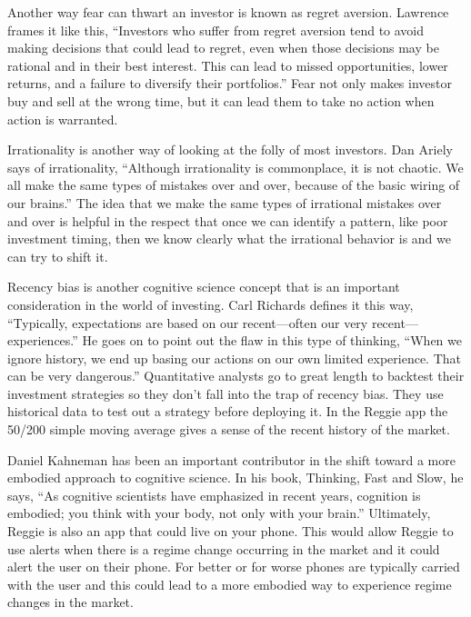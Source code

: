 \documentclass[conference]{IEEEtran}
\begin{document}
Another way fear can thwart an investor is known as regret aversion. Lawrence frames it like this, ``Investors who suffer from regret aversion tend to avoid making decisions that could lead to regret, even when those decisions may be rational and in their best interest. This can lead to missed opportunities, lower returns, and a failure to diversify their portfolios.''\cite{b13} Fear not only makes investor buy and sell at the wrong time, but it can lead them to take no action when action is warranted. 

Irrationality is another way of looking at the folly of most investors. Dan Ariely says of irrationality, ``Although irrationality is commonplace, it is not chaotic. We all make the same types of mistakes over and over, because of the basic wiring of our brains.'' \cite{b10} The idea that we make the same types of irrational mistakes over and over is helpful in the respect that once we can identify a pattern, like poor investment timing, then we know clearly what the irrational behavior is and we can try to shift it.

Recency bias is another cognitive science concept that is an important consideration in the world of investing. Carl Richards defines it this way, ``Typically, expectations are based on our recent—often our very recent—experiences.'' \cite{b4} He goes on to point out the flaw in this type of thinking, ``When we ignore history, we end up basing our actions on our own limited experience. That can be very dangerous.''\cite{b4} Quantitative analysts go to great length to backtest their investment strategies so they don't fall into the trap of recency bias. They use historical data to test out a strategy before deploying it. In the Reggie app the 50/200 simple moving average gives a sense of the recent history of the market.

Daniel Kahneman has been an important contributor in the shift toward a more embodied approach to cognitive science. In his book, Thinking, Fast and Slow, he says, ``As cognitive scientists have emphasized in recent years, cognition is embodied; you think with your body, not only with your brain.''\cite{b7} Ultimately, Reggie is also an app that could live on your phone. This would allow Reggie to use alerts when there is a regime change occurring in the market and it could alert the user on their phone. For better or for worse phones are typically carried with the user and this could lead to a more embodied way to experience regime changes in the market. 
\end{document}
